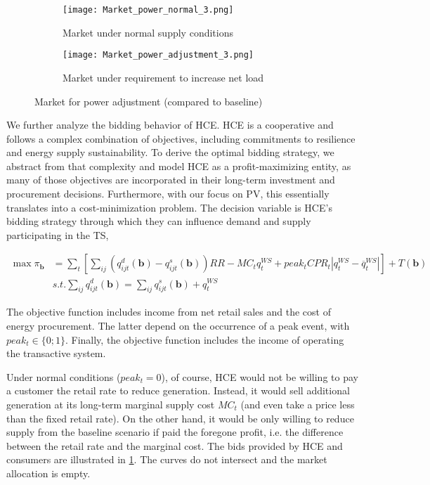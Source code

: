 \begin{figure}[t]\label{fig:baseline}
  \begin{subfigure}[t]{0.485\linewidth}
    \centering\texttt{[image: Market\_power\_normal\_3.png]}
    \caption{Market under normal supply conditions}
    \label{fig:lem_adjustment_normal}
  \end{subfigure}\hspace{0.5cm}
  \begin{subfigure}[t]{.485\linewidth}
    \centering\texttt{[image: Market\_power\_adjustment\_3.png]}
    \caption{Market under requirement to increase net load} 
    \label{fig:lem_adjustment}
  \end{subfigure}
\caption{Market for power adjustment (compared to baseline)}
\end{figure}

We further analyze the bidding behavior of HCE. HCE is a cooperative and follows a complex combination of objectives, including commitments to resilience and energy supply sustainability. To derive the optimal bidding strategy, we abstract from that complexity and model HCE as a profit-maximizing entity, as many of those objectives are incorporated in their long-term investment and procurement decisions. Furthermore, with our focus on PV, this essentially translates into a cost-minimization problem. The decision variable is HCE's bidding strategy through which they can influence demand and supply participating in the TS,

\begin{align}
    \max \pi_\mathbf{b} &= \sum_t [\sum_{ij} (q^d_{ijt}(\mathbf{b}) -  q^s_{ijt}(\mathbf{b})) RR - MC_t q^{WS}_t + peak_t CPR_t |q^{WS}_t - \overline{q}^{WS}_t| ] + T(\mathbf{b}) \nonumber \\
    & s.t. \sum_{ij} q^d_{ijt}(\mathbf{b}) =  \sum_{ij} q^s_{ijt}(\mathbf{b}) + q^{WS}_t
\end{align}

The objective function includes income from net retail sales and the cost of energy procurement. The latter depend on the occurrence of a peak event, with $peak_t \in \{0;1\}$. Finally, the objective function includes the income of operating the transactive system. 

Under normal conditions ($peak_t = 0$), of course, HCE would not be willing to pay a customer the retail rate to reduce generation. Instead, it would sell additional generation at its long-term marginal supply cost $MC_t$ (and even take a price less than the fixed retail rate). On the other hand, it would be only willing to reduce supply from the baseline scenario if paid the foregone profit, i.e. the difference between the retail rate and the marginal cost. The bids provided by HCE and consumers are illustrated in \cref{fig:lem_adjustment_normal}. The curves do not intersect and the market allocation is empty.

